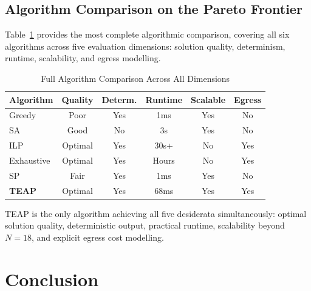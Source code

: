 \documentclass[sigconf,10pt]{acmart}
\begin{document}
\subsection{Algorithm Comparison on the Pareto Frontier}

Table~\ref{tab:algo_compare_full} provides the most complete algorithmic comparison,
covering all six algorithms across five evaluation dimensions: solution quality,
determinism, runtime, scalability, and egress modelling.

\begin{table}[h]
\centering\caption{Full Algorithm Comparison Across All Dimensions}\label{tab:algo_compare_full}
\footnotesize\setlength{\tabcolsep}{3pt}
\begin{tabular}{lccccc}
\toprule
Algorithm & Quality & Determ. & Runtime & Scalable & Egress\\
\midrule
Greedy       & Poor   & Yes & 1ms     & Yes & No\\
SA           & Good   & No  & 3s      & Yes & No\\
ILP          & Optimal& Yes & 30s+    & No  & Yes\\
Exhaustive   & Optimal& Yes & Hours   & No  & Yes\\
SP           & Fair   & Yes & 1ms     & Yes & No\\
\textbf{TEAP}& Optimal& Yes & 68ms    & Yes & Yes\\
\bottomrule
\end{tabular}
\end{table}

TEAP is the only algorithm achieving all five desiderata simultaneously: optimal
solution quality, deterministic output, practical runtime, scalability beyond
$N=18$, and explicit egress cost modelling.



\section{Conclusion}\label{sec:conc}
\end{document}
